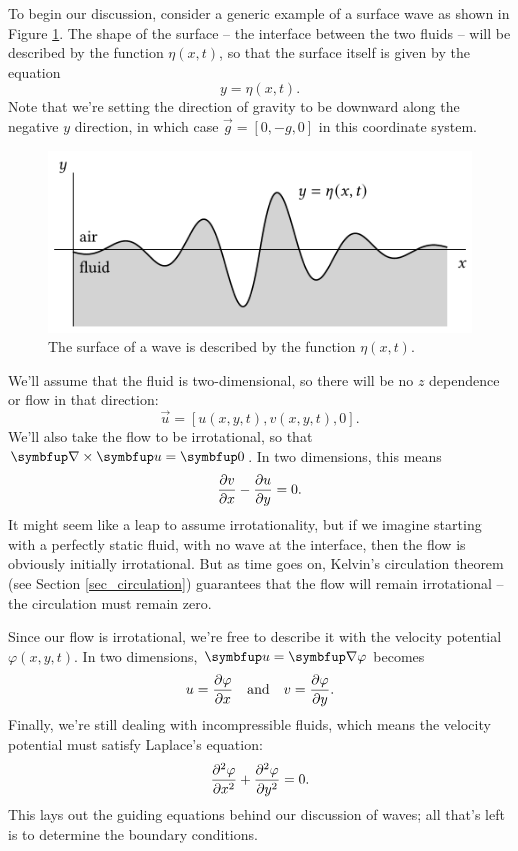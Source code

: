 To begin our discussion, consider a generic example of a surface wave as shown in Figure \ref{fig_generic_wave}.  The shape of the surface -- the interface between the two fluids -- will be described by the function $\eta(x, t)$, so that the surface itself is given by the equation
\begin{equation}
y = \eta(x, t).
\end{equation}
Note that we're setting the direction of gravity to be downward along the negative $y$ direction, in which case $\vec{g} = [0, -g, 0]$ in this coordinate system.

\begin{figure}
\centering\includegraphics[width=0.8\linewidth]{Figures/Chapter5/fig_generic_wave}
\caption{The surface of a wave is described by the function $\eta(x, t)$.}
\label{fig_generic_wave}
\end{figure}

We'll assume that the fluid is two-dimensional, so there will be no $z$ dependence or flow in that direction:
\[
\vec{u} = [u(x, y, t), v(x, y, t), 0].
\]
We'll also take the flow to be irrotational, so that $\curl \vec{u} = \vec{0}$.  In two dimensions, this means
\[
\frac{\partial {v}}{\partial {x}} - \frac{\partial {u}}{\partial {y}} = 0.
\]
It might seem like a leap to assume irrotationality, but if we imagine starting with a perfectly static fluid, with no wave at the interface, then the flow is obviously initially irrotational.  But as time goes on, Kelvin's circulation theorem (see Section \ref{sec_circulation}) guarantees that the flow will remain irrotational -- the circulation must remain zero.

Since our flow is irrotational, we're free to describe it with the velocity potential $\varphi(x, y, t)$.  In two dimensions, $\vec{u} = \grad \varphi$ becomes
\begin{equation}
u = \frac{\partial {\varphi}}{\partial {x}} \quad \text{and} \quad v = \frac{\partial {\varphi}}{\partial {y}}.
\end{equation}
Finally, we're still dealing with incompressible fluids, which means the velocity potential must satisfy Laplace's equation:
\begin{equation}
\frac{\partial^2 {\varphi}}{\partial {x}^2} + \frac{\partial^2 {\varphi}}{\partial {y}^2} = 0.
\end{equation}
This lays out the guiding equations behind our discussion of waves; all that's left is to determine the boundary conditions.

